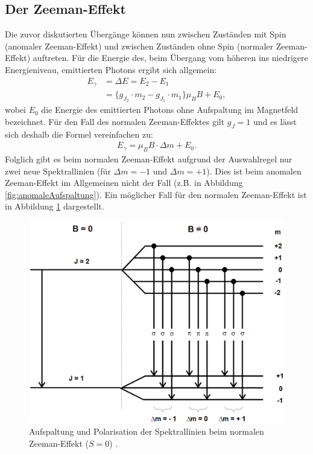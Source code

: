 \subsection{Der Zeeman-Effekt}
Die zuvor diskutierten Übergänge können nun zwischen Zuständen mit Spin (anomaler Zeeman-Effekt) und zwischen Zuständen ohne Spin (normaler Zeeman-Effekt) auftreten. Für die Energie des, beim Übergang vom höheren ins niedrigere Energieniveau, emittierten Photons ergibt sich allgemein:
\begin{align*}
	E_\gamma &= \Delta E = E_2-E_1 \\
	&=\{g_{J_2} \cdot m_2-g_{J_1} \cdot m_1 \} \mu_B B  + E_0,
\end{align*}
wobei $E_0$ die Energie des emittierten Photons ohne Aufspaltung im Magnetfeld bezeichnet.
Für den Fall des normalen Zeeman-Effektes gilt $g_{J}=1$ und es lässt sich deshalb die Formel vereinfachen zu:
\begin{align*}
	E_\gamma = \mu_B B \cdot \Delta m +E_0.
\end{align*}
Folglich gibt es beim normalen Zeeman-Effekt aufgrund der Auswahlregel nur zwei neue Spektrallinien (für $\Delta m = -1$ und $\Delta m = +1$). Dies ist beim anomalen Zeeman-Effekt im Allgemeinen nicht der Fall (z.B. in Abbildung \ref{fig:anomaleAufspaltung}). Ein möglicher Fall für den normalen Zeeman-Effekt ist in Abbildung \ref{fig:normaleAufspaltung} dargestellt.
\begin{figure}
	\centering
	\includegraphics[width=\linewidth-150pt,height=\textheight-150pt,keepaspectratio]{content/Images/normaleAufspaltung.png}
    \caption{Aufspaltung und Polarisation der Spektrallinien beim normalen Zeeman-Effekt ($S = 0$) \cite{V27}.}
    \label{fig:normaleAufspaltung}
\end{figure}
